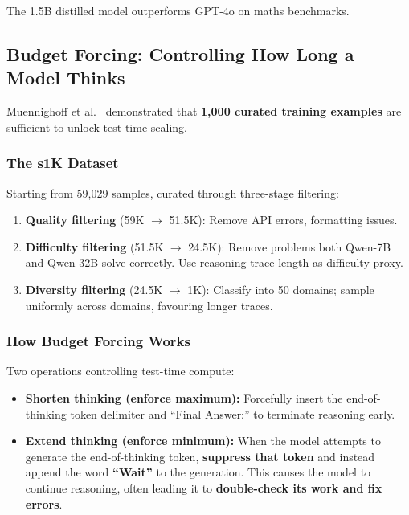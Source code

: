 \documentclass[11pt, a4paper]{article}
\theoremstyle{definition}
\theoremstyle{plain}
\begin{document}
The 1.5B distilled model outperforms GPT-4o on maths benchmarks.

\subsection{Budget Forcing: Controlling How Long a Model Thinks}
\label{subsec:budget-forcing}

Muennighoff et al.~\cite{muennighoff2025s1} demonstrated that \textbf{1,000 curated training examples} are sufficient to unlock test-time scaling.

\subsubsection{The s1K Dataset}

Starting from 59,029 samples, curated through three-stage filtering:
\begin{enumerate}
  \item \textbf{Quality filtering} (59K $\to$ 51.5K): Remove API errors, formatting issues.
  \item \textbf{Difficulty filtering} (51.5K $\to$ 24.5K): Remove problems both Qwen-7B and Qwen-32B solve correctly. Use reasoning trace length as difficulty proxy.
  \item \textbf{Diversity filtering} (24.5K $\to$ 1K): Classify into 50 domains; sample uniformly across domains, favouring longer traces.
\end{enumerate}

\subsubsection{How Budget Forcing Works}

Two operations controlling test-time compute:

\begin{itemize}
  \item \textbf{Shorten thinking (enforce maximum):} Forcefully insert the end-of-thinking token delimiter and ``Final Answer:'' to terminate reasoning early.
  \item \textbf{Extend thinking (enforce minimum):} When the model attempts to generate the end-of-thinking token, \textbf{suppress that token} and instead append the word \textbf{``Wait''} to the generation. This causes the model to continue reasoning, often leading it to \textbf{double-check its work and fix errors}.
\end{itemize}
\end{document}
